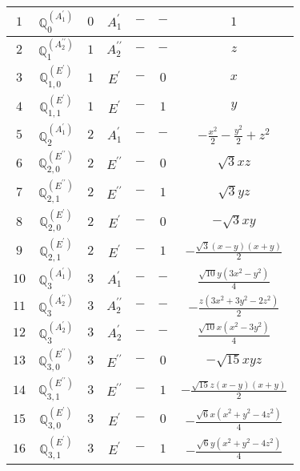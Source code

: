 \documentclass[fleqn,10pt,landscape]{article}
\begin{document}
\begin{itemize}
\begin{center}
\begin{longtable}{ccccccc}
$ 1 $ & $ \mathbb{Q}_{0}^{(A_{1}^{\prime})} $ & $ 0 $ & $ A_{1}^{\prime} $ & $ - $ & $ - $ & $ 1 $ \\ \hline
$ 2 $ & $ \mathbb{Q}_{1}^{(A_{2}^{\prime\prime})} $ & $ 1 $ & $ A_{2}^{\prime\prime} $ & $ - $ & $ - $ & $ z $ \\
$ 3 $ & $ \mathbb{Q}_{1,0}^{(E^{\prime})} $ & $ 1 $ & $ E^{\prime} $ & $ - $ & $ 0 $ & $ x $ \\
$ 4 $ & $ \mathbb{Q}_{1,1}^{(E^{\prime})} $ & $ 1 $ & $ E^{\prime} $ & $ - $ & $ 1 $ & $ y $ \\ \hline
$ 5 $ & $ \mathbb{Q}_{2}^{(A_{1}^{\prime})} $ & $ 2 $ & $ A_{1}^{\prime} $ & $ - $ & $ - $ & $ - \frac{x^{2}}{2} - \frac{y^{2}}{2} + z^{2} $ \\
$ 6 $ & $ \mathbb{Q}_{2,0}^{(E^{\prime\prime})} $ & $ 2 $ & $ E^{\prime\prime} $ & $ - $ & $ 0 $ & $ \sqrt{3} x z $ \\
$ 7 $ & $ \mathbb{Q}_{2,1}^{(E^{\prime\prime})} $ & $ 2 $ & $ E^{\prime\prime} $ & $ - $ & $ 1 $ & $ \sqrt{3} y z $ \\
$ 8 $ & $ \mathbb{Q}_{2,0}^{(E^{\prime})} $ & $ 2 $ & $ E^{\prime} $ & $ - $ & $ 0 $ & $ - \sqrt{3} x y $ \\
$ 9 $ & $ \mathbb{Q}_{2,1}^{(E^{\prime})} $ & $ 2 $ & $ E^{\prime} $ & $ - $ & $ 1 $ & $ - \frac{\sqrt{3} \left(x - y\right) \left(x + y\right)}{2} $ \\ \hline
$ 10 $ & $ \mathbb{Q}_{3}^{(A_{1}^{\prime})} $ & $ 3 $ & $ A_{1}^{\prime} $ & $ - $ & $ - $ & $ \frac{\sqrt{10} y \left(3 x^{2} - y^{2}\right)}{4} $ \\
$ 11 $ & $ \mathbb{Q}_{3}^{(A_{2}^{\prime\prime})} $ & $ 3 $ & $ A_{2}^{\prime\prime} $ & $ - $ & $ - $ & $ - \frac{z \left(3 x^{2} + 3 y^{2} - 2 z^{2}\right)}{2} $ \\
$ 12 $ & $ \mathbb{Q}_{3}^{(A_{2}^{\prime})} $ & $ 3 $ & $ A_{2}^{\prime} $ & $ - $ & $ - $ & $ \frac{\sqrt{10} x \left(x^{2} - 3 y^{2}\right)}{4} $ \\
$ 13 $ & $ \mathbb{Q}_{3,0}^{(E^{\prime\prime})} $ & $ 3 $ & $ E^{\prime\prime} $ & $ - $ & $ 0 $ & $ - \sqrt{15} x y z $ \\
$ 14 $ & $ \mathbb{Q}_{3,1}^{(E^{\prime\prime})} $ & $ 3 $ & $ E^{\prime\prime} $ & $ - $ & $ 1 $ & $ - \frac{\sqrt{15} z \left(x - y\right) \left(x + y\right)}{2} $ \\
$ 15 $ & $ \mathbb{Q}_{3,0}^{(E^{\prime})} $ & $ 3 $ & $ E^{\prime} $ & $ - $ & $ 0 $ & $ - \frac{\sqrt{6} x \left(x^{2} + y^{2} - 4 z^{2}\right)}{4} $ \\
$ 16 $ & $ \mathbb{Q}_{3,1}^{(E^{\prime})} $ & $ 3 $ & $ E^{\prime} $ & $ - $ & $ 1 $ & $ - \frac{\sqrt{6} y \left(x^{2} + y^{2} - 4 z^{2}\right)}{4} $ \\ \hline

\end{longtable}
\end{center}
\end{itemize}
\end{document}
